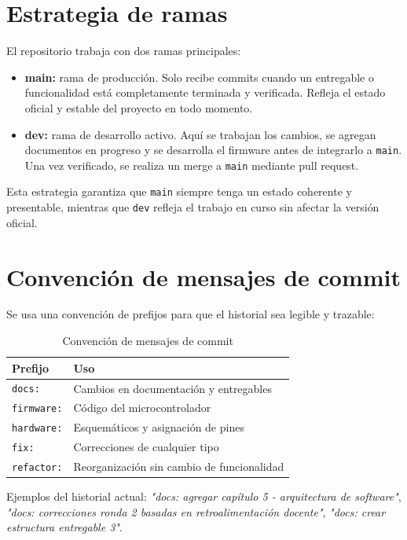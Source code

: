 \documentclass[12pt]{report}
\begin{document}
\section{Estrategia de ramas}
 
El repositorio trabaja con dos ramas principales:
 
\begin{itemize}
    \item \textbf{main:} rama de producción. Solo recibe commits cuando un entregable o funcionalidad está completamente terminada y verificada. Refleja el estado oficial y estable del proyecto en todo momento.
    \item \textbf{dev:} rama de desarrollo activo. Aquí se trabajan los cambios, se agregan documentos en progreso y se desarrolla el firmware antes de integrarlo a \texttt{main}. Una vez verificado, se realiza un merge a \texttt{main} mediante pull request.
\end{itemize}
 
Esta estrategia garantiza que \texttt{main} siempre tenga un estado coherente y presentable, mientras que \texttt{dev} refleja el trabajo en curso sin afectar la versión oficial.
 
\section{Convención de mensajes de commit}
 
Se usa una convención de prefijos para que el historial sea legible y trazable:
 
\begin{table}[H]
\centering
\renewcommand{\arraystretch}{1.3}
\begin{tabular}{|l|p{9cm}|}
\hline
\textbf{Prefijo} & \textbf{Uso} \\
\hline
\texttt{docs:} & Cambios en documentación y entregables \\
\texttt{firmware:} & Código del microcontrolador \\
\texttt{hardware:} & Esquemáticos y asignación de pines \\
\texttt{fix:} & Correcciones de cualquier tipo \\
\texttt{refactor:} & Reorganización sin cambio de funcionalidad \\
\hline
\end{tabular}
\caption{Convención de mensajes de commit}
\end{table}
 
Ejemplos del historial actual: \textit{"docs: agregar capítulo 5 - arquitectura de software"}, \textit{"docs: correcciones ronda 2 basadas en retroalimentación docente"}, \textit{"docs: crear estructura entregable 3"}.
 
\end{document}
